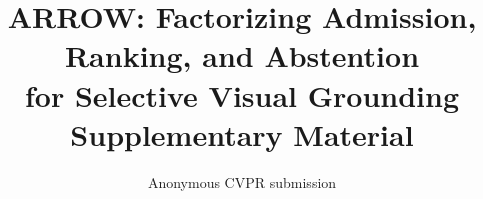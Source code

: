 \documentclass[10pt,twocolumn,letterpaper]{article}
\title{ARROW: Factorizing Admission, Ranking, and Abstention\\
for Selective Visual Grounding\\[2pt]\large Supplementary Material}
\author{Anonymous CVPR submission}
\begin{document}
\maketitle
\setcounter{section}{0}
\renewcommand{\thesection}{\Alph{section}}







\end{document}

